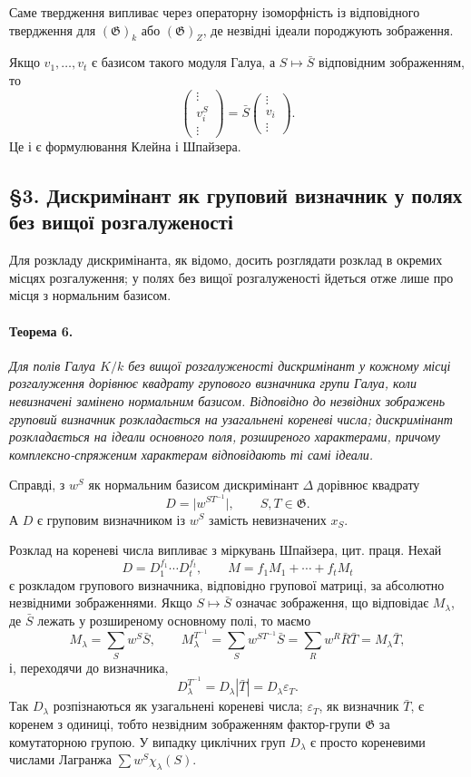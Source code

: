 \documentclass[11pt]{article}
\providecommand{\Gg}{\mathfrak{G}}
\begin{document}
Саме твердження випливає через операторну ізоморфність із відповідного твердження для \((\Gg)_k\) або \((\Gg)_Z\), де незвідні ідеали породжують зображення.

Якщо \(v_1,\ldots,v_t\) є базисом такого модуля Галуа, а \(S\mapsto \bar S\) відповідним зображенням, то
\[
        \begin{pmatrix}\vdots\\ v_i^S\\ \vdots\end{pmatrix}
        =\bar S\begin{pmatrix}\vdots\\ v_i\\ \vdots\end{pmatrix}.
\]
Це і є формулювання Клейна і Шпайзера.

\subsection*{§3. Дискримінант як груповий визначник у полях без вищої розгалуженості}

Для розкладу дискримінанта, як відомо, досить розглядати розклад в окремих місцях розгалуження; у полях без вищої розгалуженості йдеться отже лише про місця з нормальним базисом.

\paragraph{Теорема 6.}
\emph{Для полів Галуа \(K/k\) без вищої розгалуженості дискримінант у кожному місці розгалуження дорівнює квадрату групового визначника групи Галуа, коли невизначені замінено нормальним базисом. Відповідно до незвідних зображень груповий визначник розкладається на узагальнені кореневі числа; дискримінант розкладається на ідеали основного поля, розширеного характерами, причому комплексно-спряженим характерам відповідають ті самі ідеали.}

Справді, з \(w^S\) як нормальним базисом дискримінант \(\Delta\) дорівнює квадрату
\[
        D=\bigl|w^{ST^{-1}}\bigr|,\qquad S,T\in\Gg.
\]
А \(D\) є груповим визначником із \(w^S\) замість невизначених \(x_S\).

Розклад на кореневі числа випливає з міркувань Шпайзера, цит. праця. Нехай
\[
        D=D_1^{f_1}\cdots D_t^{f_t},
        \qquad
        M=f_1M_1+\cdots+f_tM_t
\]
є розкладом групового визначника, відповідно групової матриці, за абсолютно незвідними зображеннями. Якщо \(S\mapsto\bar S\) означає зображення, що відповідає \(M_\lambda\), де \(\bar S\) лежать у розширеному основному полі, то маємо
\[
        M_\lambda=\sum_S w^S\bar S,
        \qquad
        M_\lambda^{T^{-1}}=\sum_S w^{ST^{-1}}\bar S
          =\sum_R w^R\bar R\bar T=M_\lambda\bar T,
\]
і, переходячи до визначника,
\[
        D_\lambda^{T^{-1}}=D_\lambda|\bar T|=D_\lambda\varepsilon_T.
\]
Так \(D_\lambda\) розпізнаються як узагальнені кореневі числа; \(\varepsilon_T\), як визначник \(\bar T\), є коренем з одиниці, тобто незвідним зображенням фактор-групи \(\Gg\) за комутаторною групою. У випадку циклічних груп \(D_\lambda\) є просто кореневими числами Лагранжа \(\sum w^S\chi_\lambda(S)\).
\end{document}
